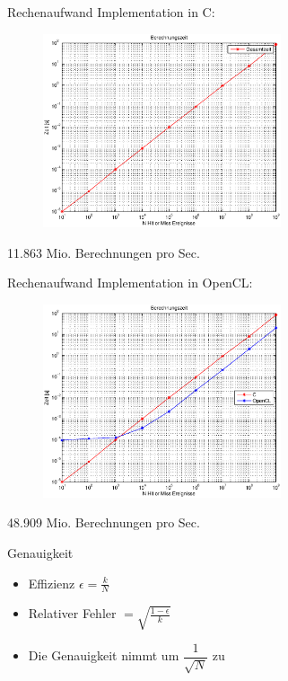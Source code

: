 \documentclass{beamer}
\begin{document}
\begin{frame}{Rechenaufwand}
	Implementation in C:
	\begin{figure}
		\centering
		\includegraphics[width=7cm]{images/Berechnungszeit_C.eps}
	\end{figure}
	11.863 Mio. Berechnungen pro Sec.
\end{frame}
\begin{frame}{Rechenaufwand}
	Implementation in OpenCL:
	\begin{figure}
		\centering
		\includegraphics[width=7cm]{images/Berechnungszeit_OpenCL.eps} 
	\end{figure}
	48.909 Mio. Berechnungen pro Sec.
\end{frame}

\begin{frame}{Genauigkeit}
	\begin{itemize}
		\item<1-> Effizienz $\epsilon = \frac{k}{N}$
		\item<1->Relativer Fehler $= \sqrt{\frac{1-\epsilon}{k}}$
		\item<1-> Die Genauigkeit nimmt um $\dfrac{1}{\sqrt{N}}$ zu
	\end{itemize}
\end{frame}
\end{document}
